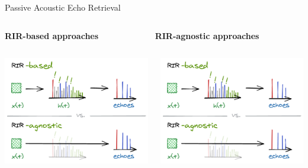 \begin{frame}[t]{\alert{Passive} Acoustic Echo Retrieval \hfill\faBook}

        \vspace{.5em}
        \begin{columns}[T,onlytextwidth] %
            \begin{column}{.48\textwidth}
                \textbf{RIR-\alert{based} approaches}
            \end{column}
            \begin{column}{.48\textwidth}
                \textbf{RIR-\alert{agnostic} approaches}
            \end{column}%
        \end{columns}

        \vspace{.5em}
        \begin{columns}[onlytextwidth] %
            \begin{column}{.48\textwidth}
                \includegraphics[trim={0 31em 0 7em},clip,width=.9\textwidth]{./figures/based-agnostic.png}
            \end{column}
            \begin{column}{.48\textwidth}
                \includegraphics[trim={0 0 0 40em},clip,width=.9\textwidth]{./figures/based-agnostic.png}
            \end{column}%
        \end{columns}


\end{frame}
